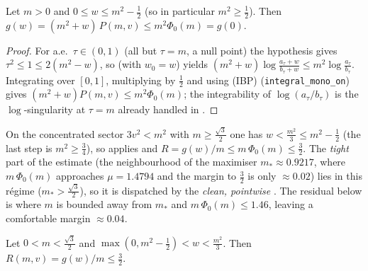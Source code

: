 \begin{lemma}
\label{lem:ls_r2_wide}
Let $m>0$ and $0\le w\le m^2-\tfrac12$ (so in particular $m^2\ge\tfrac12$). Then
$g(w)=(m^2+w)\,P(m,v)\le m^2\Phi_0(m)=g(0)$.
\end{lemma}

\begin{proof}
For a.e.\ $\tau\in(0,1)$ (all but $\tau=m$, a null point) the hypothesis gives
$\tau^2\le1\le2(m^2-w)$, so  (with $w_0=w$) yields
$(m^2+w)\log\frac{a_\tau+w}{b_\tau+w}\le m^2\log\frac{a_\tau}{b_\tau}$. Integrating over
$[0,1]$, multiplying by $\tfrac12$ and using \textup{(IBP)}
(\texttt{integral\_mono\_on}) gives
$(m^2+w)P(m,v)\le m^2\Phi_0(m)$; the integrability of $\log(a_\tau/b_\tau)$ is the
$\log$-singularity at $\tau=m$ already handled in .
\end{proof}

\begin{remark}
\label{rem:ls_r2_wide_covers}
On the concentrated sector $3v^2<m^2$ with $m\ge\tfrac{\sqrt3}2$ one has
$w<\tfrac{m^2}3\le m^2-\tfrac12$ (the last step is $m^2\ge\tfrac34$), so
 applies and $R=g(w)/m\le m\,\Phi_0(m)\le\tfrac32$. The
\emph{tight} part of the estimate (the neighbourhood of the maximiser
$m_\ast\approx0.9217$, where $m\,\Phi_0(m)$ approaches $\mu=1.4794$ and the margin to
$\tfrac32$ is only $\approx0.02$) lies in this régime ($m_\ast>\tfrac{\sqrt3}2$), so
it is dispatched by the \emph{clean, pointwise} . The
residual below is where $m$ is bounded away from $m_\ast$ and $m\,\Phi_0(m)\le1.46$,
leaving a comfortable margin $\approx0.04$.
\end{remark}

\begin{lemma}
\label{lem:ls_r2_sliver}
Let $0<m<\tfrac{\sqrt3}2$ and $\max(0,m^2-\tfrac12)<w<\tfrac{m^2}3$. Then
$R(m,v)=g(w)/m\le\tfrac32$.
\end{lemma}


